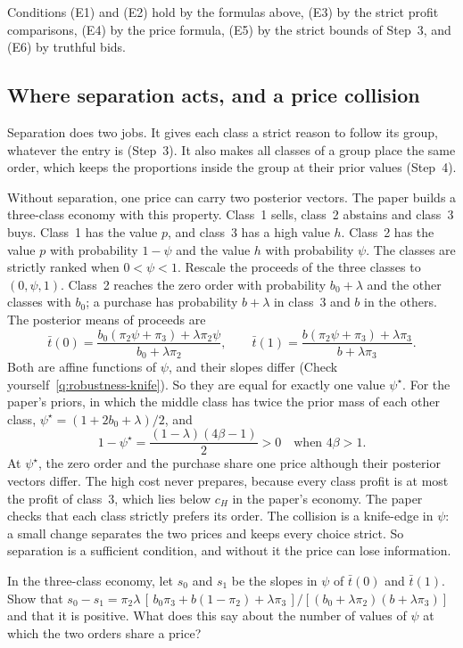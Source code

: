 Conditions (E1) and (E2) hold by the formulas above, (E3) by the strict profit comparisons, (E4) by the price formula, (E5) by the strict bounds of Step~3, and (E6) by truthful bids.

\subsection{Where separation acts, and a price collision}

Separation does two jobs.
It gives each class a strict reason to follow its group, whatever the entry is (Step~3).
It also makes all classes of a group place the same order, which keeps the proportions inside the group at their prior values (Step~4).

Without separation, one price can carry two posterior vectors.
The paper builds a three-class economy with this property.
Class~1 sells, class~2 abstains and class~3 buys.
Class~1 has the value \(p\), and class~3 has a high value \(h\).
Class~2 has the value \(p\) with probability \(1-\psi\) and the value \(h\) with probability \(\psi\).
The classes are strictly ranked when \(0<\psi<1\).
Rescale the proceeds of the three classes to \((0,\psi,1)\).
Class~2 reaches the zero order with probability \(b_0+\lambda\) and the other classes with \(b_0\); a purchase has probability \(b+\lambda\) in class~3 and \(b\) in the others.
The posterior means of proceeds are
\[
\bar t(0)=\frac{b_0(\pi_2\psi+\pi_3)+\lambda\pi_2\psi}{b_0+\lambda\pi_2},\qquad
\bar t(1)=\frac{b(\pi_2\psi+\pi_3)+\lambda\pi_3}{b+\lambda\pi_3}.
\]
Both are affine functions of \(\psi\), and their slopes differ (Check yourself~\ref{q:robustness-knife}).
So they are equal for exactly one value \(\psi^\star\).
For the paper's priors, in which the middle class has twice the prior mass of each other class, \(\psi^\star=(1+2b_0+\lambda)/2\), and
\[
1-\psi^\star=\frac{(1-\lambda)(4\beta-1)}2>0\quad\text{when }4\beta>1.
\]
At \(\psi^\star\), the zero order and the purchase share one price although their posterior vectors differ.
The high cost never prepares, because every class profit is at most the profit of class~3, which lies below \(c_H\) in the paper's economy.
The paper checks that each class strictly prefers its order.
The collision is a knife-edge in \(\psi\): a small change separates the two prices and keeps every choice strict.
So separation is a sufficient condition, and without it the price can lose information.

\begin{checkyourself}
In the three-class economy, let \(s_0\) and \(s_1\) be the slopes in \(\psi\) of \(\bar t(0)\) and \(\bar t(1)\).
Show that \(s_0-s_1=\pi_2\lambda\,[\,b_0\pi_3+b(1-\pi_2)+\lambda\pi_3\,]/[(b_0+\lambda\pi_2)(b+\lambda\pi_3)]\) and that it is positive.
What does this say about the number of values of \(\psi\) at which the two orders share a price?
\label{q:robustness-knife}
\end{checkyourself}

